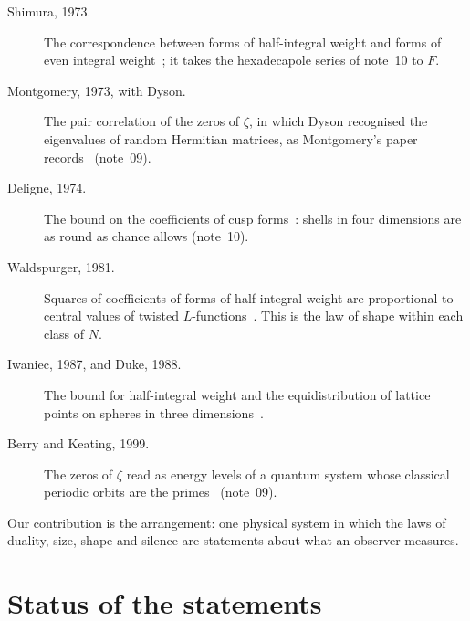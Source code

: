 \documentclass[11pt]{article}
\begin{document}
\begin{description}
\item[Shimura, 1973.] The correspondence between forms of half-integral weight and forms of even integral weight~\cite{Shimura}; it takes the hexadecapole series of note~10 to $F$.
\item[Montgomery, 1973, with Dyson.] The pair correlation of the zeros of $\zeta$, in which Dyson recognised the eigenvalues of random Hermitian matrices, as Montgomery's paper records~\cite{Montgomery} (note~09).
\item[Deligne, 1974.] The bound on the coefficients of cusp forms~\cite{Deligne}: shells in four dimensions are as round as chance allows (note~10).
\item[Waldspurger, 1981.] Squares of coefficients of forms of half-integral weight are proportional to central values of twisted $L$-functions~\cite{Waldspurger}. This is the law of shape within each class of $N$.
\item[Iwaniec, 1987, and Duke, 1988.] The bound for half-integral weight and the equidistribution of lattice points on spheres in three dimensions~\cite{Iwaniec87,Duke}.
\item[Berry and Keating, 1999.] The zeros of $\zeta$ read as energy levels of a quantum system whose classical periodic orbits are the primes~\cite{BerryKeating} (note~09).
\end{description}

\noindent
Our contribution is the arrangement: one physical system in which the laws of duality, size, shape and silence are statements about what an observer measures.

\section*{Status of the statements}
\end{document}
